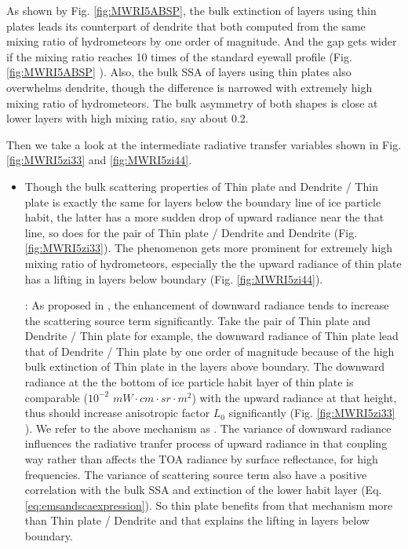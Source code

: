 As shown by Fig. \ref{fig:MWRI5ABSP}, the bulk extinction of layers using thin plates leads its counterpart of dendrite
that both computed from the same mixing ratio of hydrometeors by one order of magnitude. And the gap gets wider if the mixing ratio
reaches 10 times of the standard eyewall profile (Fig. \ref{fig:MWRI5ABSP} ). Also, the bulk SSA of
layers using thin plates also overwhelms dendrite, though the difference is narrowed with extremely high mixing ratio of hydrometeors. 
The bulk asymmetry of both shapes is close at lower layers with high mixing ratio, say about 0.2.

Then we take a look at the intermediate radiative transfer variables shown in Fig. \ref{fig:MWRI5zi33} and \ref{fig:MWRI5zi44}.

\begin{itemize}
    \item {}
    Though the bulk scattering properties of Thin plate and Dendrite / Thin plate is exactly the same for layers below the
boundary line of ice particle habit, the latter has a more sudden drop of upward radiance near the that line, so does for the pair
of Thin plate / Dendrite and Dendrite (Fig. \ref{fig:MWRI5zi33}). The phenomenon gets more prominent for extremely high mixing ratio
of hydrometeors, especially the the upward radiance of thin plate has a lifting in layers below boundary (Fig. \ref{fig:MWRI5zi44}).

    : As proposed in , the enhancement of downward radiance tends to increase the scattering source term 
significantly. Take the pair of Thin plate and Dendrite / Thin plate for example, the downward radiance of Thin plate lead
that of Dendrite / Thin plate by one order of magnitude because of the high bulk extinction of Thin plate in the layers above boundary.
The downward radiance at the the bottom of ice particle habit layer of thin plate is comparable ($10^{-2}$ $mW \cdot cm \cdot sr \cdot m^{2}$) 
with the upward radiance at that height, thus should increase anisotropic factor $L_{0}$ significantly (Fig. \ref{fig:MWRI5zi33} ).
We refer to the above mechanism as .
The variance of downward radiance influences the radiative tranfer process of upward radiance in that coupling way 
rather than affects the TOA radiance by surface reflectance, for high frequencies.
The variance of scattering source term also have a positive correlation with the bulk SSA and extinction of the lower habit layer
(Eq. \ref{eq:emsandscaexpression}). So thin plate benefits from that mechanism more than Thin plate / Dendrite and that explains the lifting
in layers below boundary.


\end{itemize}
